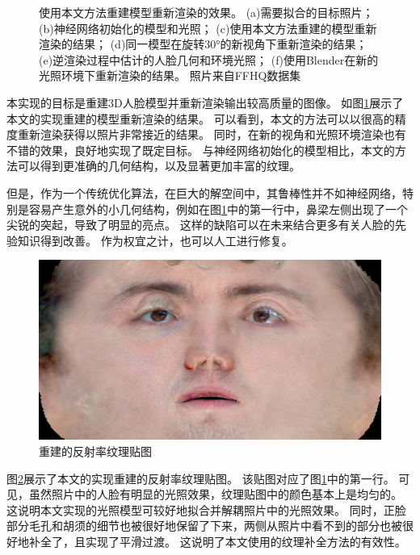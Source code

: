 \begin{figure}
\caption[重建模型重新渲染的效果]{
    使用本文方法重建模型重新渲染的效果。
    (a)需要拟合的目标照片；
    (b)神经网络初始化的模型和光照；
    (c)使用本文方法重建的模型重新渲染的结果；
    (d)同一模型在旋转30°的新视角下重新渲染的结果；
    (e)逆渲染过程中估计的人脸几何和环境光照；
    (f)使用Blender在新的光照环境下重新渲染的结果。
    照片来自FFHQ数据集\citep{styleGAN}
}
\label{fig:rerender}
\end{figure}
本实现的目标是重建3D人脸模型并重新渲染输出较高质量的图像。
如图\ref{fig:rerender}展示了本文的实现重建的模型重新渲染的结果。
可以看到，本文的方法可以以很高的精度重新渲染获得以照片非常接近的结果。
同时，在新的视角和光照环境渲染也有不错的效果，良好地实现了既定目标。
与神经网络初始化的模型相比，本文的方法可以得到更准确的几何结构，以及显著更加丰富的纹理。

但是，作为一个传统优化算法，在巨大的解空间中，其鲁棒性并不如神经网络，特别是容易产生意外的小几何结构，例如在图\ref{fig:rerender}中的第一行中，鼻梁左侧出现了一个尖锐的突起，导致了明显的亮点。
这样的缺陷可以在未来结合更多有关人脸的先验知识得到改善。
作为权宜之计，也可以人工进行修复。

\begin{figure}
    \centering
    \includegraphics[width=\linewidth]{figures/diffrast_face/00015/final_diffuse}
    \caption{重建的反射率纹理贴图}
    \label{fig:diffuse_map}
\end{figure}
图\ref{fig:diffuse_map}展示了本文的实现重建的反射率纹理贴图。
该贴图对应了图\ref{fig:rerender}中的第一行。
可见，虽然照片中的人脸有明显的光照效果，纹理贴图中的颜色基本上是均匀的。
这说明本文实现的光照模型可较好地拟合并解耦照片中的光照效果。
同时，正脸部分毛孔和胡须的细节也被很好地保留了下来，两侧从照片中看不到的部分也被很好地补全了，且实现了平滑过渡。
这说明了本文使用的纹理补全方法的有效性。

